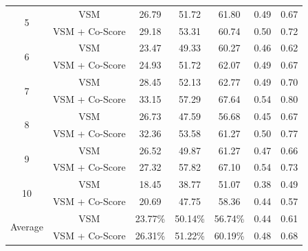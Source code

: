 \documentclass[conference]{IEEEtran}
\begin{document}
\begin{table}[htbp]
{\begin{tabular}{|c|c|c|c|c|c|c|}
			\multirow{2}{*}{5}                                                                               & VSM & 26.79 & 51.72 & 61.80 & 0.49 & 0.67 \\   \cline{2-7} &VSM + Co-Score                                                                       & 29.18                                                 & 53.31                                                 & 60.74                                                  &  0.50   & 0.72     \\  \hline
			\multirow{2}{*}{6}                                                                               & VSM & 23.47 & 49.33 & 60.27 & 0.46 & 0.62 \\  \cline{2-7}  &VSM + Co-Score 
			&24.93 &
			51.72 &
			62.07 & 0.49 &
			0.67     \\  \hline 
			\multirow{2}{*}{7}                                                                               & VSM & 28.45 & 52.13 & 62.77 & 0.49 & 0.70 \\  \cline{2-7}  &VSM + Co-Score 
			
			&33.15 &
			57.29 &
			67.64 & 0.54 &
			0.80     \\  \hline
			\multirow{2}{*}{8}                                                                               & VSM & 26.73 & 47.59 & 56.68 & 0.45 & 0.67 \\  \cline{2-7}  &VSM + Co-Score 
			&32.36 &
			53.58 &
			61.27 & 0.50 &
			0.77    \\  \hline
			\multirow{2}{*}{9}                                                                               & VSM & 26.52 & 49.87 & 61.27 & 0.47 & 0.66 \\  \cline{2-7}   &VSM + Co-Score 
			&27.32 &
			57.82 &
			67.10 & 0.54 &
			0.73    \\  \hline
			\multirow{2}{*}{10}                                                                               & VSM & 18.45 & 38.77 & 51.07 & 0.38 & 0.49 \\  \cline{2-7}  &VSM + Co-Score
			&20.69 &
			47.75 &
			58.36 & 0.44 &
			0.57    \\ \hline \hline
			\multirow{2}{*}{Average}                                                                               & VSM & 23.77\% & 50.14\% & 56.74\% & 0.44 & 0.61 \\  \cline{2-7}   &VSM + Co-Score      & 26.31\%                                                 & 51.22\%                                                 & 60.19\%                                                  &   0.48  &  0.68    \\ 
			\hline
	\end{tabular}}
\centering
\end{table}
\end{document}
